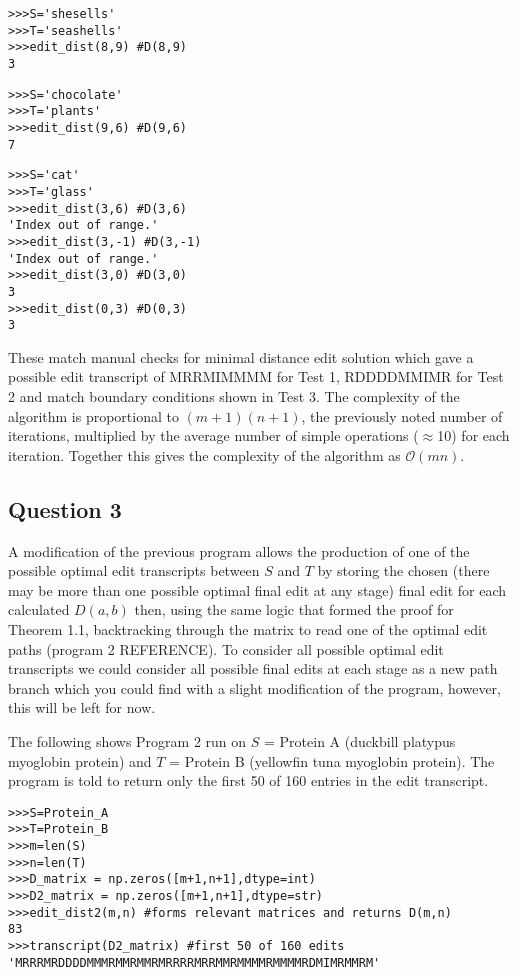 \documentclass{article}
\begin{document}
\begin{lstlisting}
>>>S='shesells'
>>>T='seashells'
>>>edit_dist(8,9) #D(8,9)
3
\end{lstlisting}

\begin{lstlisting}
>>>S='chocolate'
>>>T='plants'
>>>edit_dist(9,6) #D(9,6)
7
\end{lstlisting}

\begin{lstlisting}
>>>S='cat'
>>>T='glass'
>>>edit_dist(3,6) #D(3,6)
'Index out of range.'
>>>edit_dist(3,-1) #D(3,-1)
'Index out of range.'
>>>edit_dist(3,0) #D(3,0)
3
>>>edit_dist(0,3) #D(0,3)
3
\end{lstlisting}

These match manual checks for minimal distance edit solution which gave a possible edit transcript of MRRMIMMMM for Test 1, RDDDDMMIMR for Test 2 and match boundary conditions shown in Test 3. The complexity of the algorithm is proportional to $(m+1)(n+1)$, the previously noted number of iterations, multiplied by the average number of simple operations ($\approx$10) for each iteration. Together this gives the complexity of the algorithm as $\mathcal{O} (mn)$.


\subsection{Question 3}

A modification of the previous program allows the production of one of the possible optimal edit transcripts between $S$ and $T$ by storing the chosen (there may be more than one possible optimal final edit at any stage) final edit for each calculated $D(a,b)$ then, using the same logic that formed the proof for Theorem 1.1, backtracking through the matrix to read one of the optimal edit paths (program 2 REFERENCE). To consider all possible optimal edit transcripts we could consider all possible final edits at each stage as a new path branch which you could find with a slight modification of the program, however, this will be left for now. 

The following shows Program 2 run on $S$ = Protein A (duckbill platypus myoglobin protein) and $T$ = Protein B (yellowfin tuna myoglobin protein). The program is told to return only the first 50 of 160 entries in the edit transcript.
\begin{lstlisting}
>>>S=Protein_A
>>>T=Protein_B
>>>m=len(S)
>>>n=len(T)
>>>D_matrix = np.zeros([m+1,n+1],dtype=int)
>>>D2_matrix = np.zeros([m+1,n+1],dtype=str)
>>>edit_dist2(m,n) #forms relevant matrices and returns D(m,n)
83
>>>transcript(D2_matrix) #first 50 of 160 edits
'MRRRMRDDDDMMMRMMRMMRMRRRRMRRMMRMMMMRMMMMRDMIMRMMRM'
\end{lstlisting}
\end{document}
